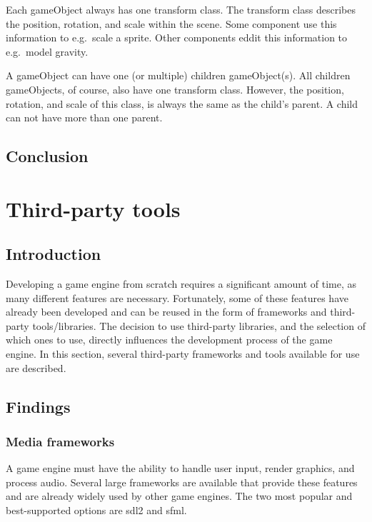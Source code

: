 \documentclass{projdoc}
\begin{document}
Each gameObject always has one transform class. The transform class describes the
position, rotation, and scale within the scene. Some component use this information
to e.g.~scale a sprite. Other components eddit this information to e.g.~model
gravity. \autocite{man:unityTransformClass}

A gameObject can have one (or multiple) children gameObject(s). All children
gameObjects, of course, also have one transform class. However, the position,
rotation, and scale of this class, is always the same as the child's parent. A child
can not have more than one parent. \autocite{man:unityTransformClass}

\subsection{Conclusion}

\section{Third-party tools}

\subsection{Introduction}

Developing a game engine from scratch requires a significant amount of time, as many
different features are necessary. Fortunately, some of these features have already
been developed and can be reused in the form of frameworks and third-party
tools/libraries. The decision to use third-party libraries, and the selection of
which ones to use, directly influences the development process of the game engine. In
this section, several third-party frameworks and tools available for use are
described.

\subsection{Findings}

\subsubsection{Media frameworks}

A game engine must have the ability to handle user input, render graphics, and
process audio. Several large frameworks are available that provide these features and
are already widely used by other game engines. The two most popular and
best-supported options are \gls{sdl2} and \gls{sfml}.
\end{document}
